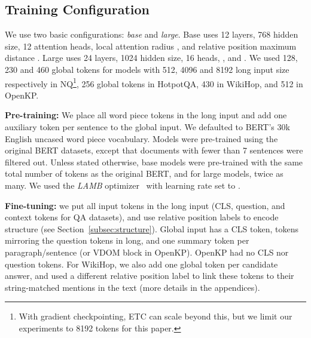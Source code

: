 \documentclass[11pt,a4paper]{article}
\begin{document}
\subsection{Training Configuration}

We use two basic configurations: {\em base} and {\em large}. Base uses 12 layers, 768 hidden size, 12 attention heads, local attention radius , and relative position maximum distance . Large uses 24 layers, 1024 hidden size, 16 heads, , and . We used 128, 230 and 460 global tokens for models with 512, 4096 and 8192 long input size respectively in NQ\footnote{With gradient checkpointing, ETC can scale beyond this, but we limit our experiments to 8192 tokens for this paper.}, 256 global tokens in HotpotQA, 430 in WikiHop, and 512 in OpenKP.




{\bf Pre-training:} We place all word piece tokens in the long input and add one auxiliary token per sentence to the global input.
We defaulted to BERT's 30k English uncased word piece vocabulary. Models were pre-trained using the original BERT datasets, except that documents with fewer than 7 sentences were filtered out. Unless stated otherwise, base models were pre-trained with the same total number of tokens as the original BERT, and for large models, twice as many. We used the {\em LAMB} optimizer~\cite{you2019large} with learning rate set to . 

{\bf Fine-tuning:} we put all input tokens in the long input (CLS, question, and context tokens for QA datasets), and use relative position labels to encode structure (see Section~\ref{subsec:structure}). Global input has a CLS token, tokens mirroring the question tokens in long, and one summary token per paragraph/sentence (or VDOM block in OpenKP). OpenKP had no CLS nor question tokens. For WikiHop, we also add one global token per candidate answer, and used a different relative position label to link these tokens to their string-matched mentions in the text (more details in the appendices).
\end{document}
